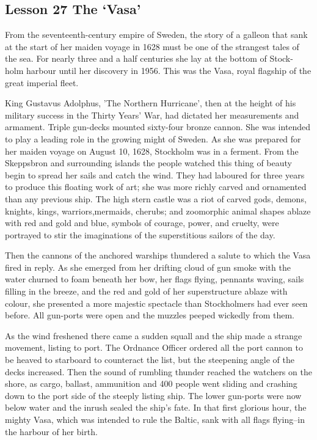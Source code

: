 \documentclass[kindlepaper]{BHCexam4kindle}
\begin{document}
\subsection{Lesson 27
The ‘Vasa'}
\par
From the seventeenth-century empire of Sweden, the story of a galleon that
sank at the start of her maiden voyage in 1628 must be one of the strangest tales
of the sea. For nearly three and a half centuries she lay at the bottom of Stock-
holm harbour until her discovery in 1956. This was the Vasa, royal flagship of
the great imperial fleet.
\par
King Gustavus Adolphus, 'The Northern Hurricane', then at the height of
his military success in the Thirty Years' War, had dictated her measurements
and armament. Triple gun-decks mounted sixty-four bronze cannon. She was
intended to play a leading role in the growing might of Sweden.
As she was prepared for her maiden voyage on August 10, 1628, Stockholm
was in a ferment. From the Skeppsbron and surrounding islands the people
watched this thing of beauty begin to spread her sails and catch the wind. They
had laboured for three years to produce this floating work of art; she was more
richly carved and ornamented than any previous ship. The high stern castle was
a riot of carved gods, demons, knights, kings, warriors,mermaids, cherubs; and
zoomorphic animal shapes ablaze with red and gold and blue, symbols of courage,
power, and cruelty, were portrayed to stir the imaginations of the superstitious
sailors of the day.
\par
Then the cannons of the anchored warships thundered a salute to which the
Vasa fired in reply. As she emerged from her drifting cloud of gun smoke with
the water churned to foam beneath her bow, her flags flying, pennants waving,
sails filling in the breeze, and the red and gold of her superstructure ablaze with
colour, she presented a more majestic spectacle than Stockholmers had ever seen
before. All gun-ports were open and the muzzles peeped wickedly from them.
\par
As the wind freshened there came a sudden squall and the ship made a strange
movement, listing to port. The Ordnance Officer ordered all the port cannon to
be heaved to starboard to counteract the list, but the steepening angle of the decks
increased. Then the sound of rumbling thunder reached the watchers on the
shore, as cargo, ballast, ammunition and 400 people went sliding and crashing
down to the port side of the steeply listing ship. The lower gun-ports were now
below water and the inrush sealed the ship's fate. In that first glorious hour, the
mighty Vasa, which was intended to rule the Baltic, sank with all flags flying--in
the harbour of her birth.
\clearpage
\end{document}
